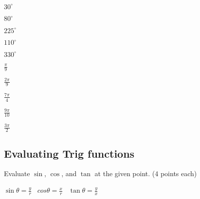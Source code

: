 \documentclass[12pt]{article}
\begin{document}
\begin{enumerate}[resume]
\begin{multicols}{2}

\item $30^\circ$\\

\item $80^\circ$\\

\item $225^\circ$\\

\item $110^\circ$\\

\item $330^\circ$\\

\columnbreak

\item $\frac{\pi}{9}$\\

\item $\frac{2\pi}{9}$\\

\item $\frac{7\pi}{4}$\\

\item $\frac{9\pi}{10}$\\

\item $\frac{3\pi}{2}$\\

\end{multicols}
\end{enumerate}


\pagebreak

\subsection*{Evaluating Trig functions}

Evaluate $\sin$, $\cos$, and $\tan$ at the given point. (4 points each)\\

\begin{center}
$\sin\theta=\frac{y}{r}$ \ $cos\theta=\frac{x}{r}$ \ $\tan\theta=\frac{y}{x}$\\
\end{center}

\vspace{12pt}
\end{document}
